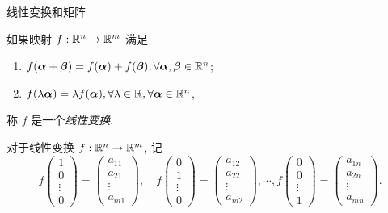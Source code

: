 \begin{frame}{线性变换和矩阵}
	\onslide<+->
	\begin{definition}
		如果映射 $f:{\mathbb{R}}^n\to{\mathbb{R}}^m$ 满足
		\begin{enumerate}
			\item $f({\boldsymbol{\alpha}}+{\boldsymbol{\beta}})=f({\boldsymbol{\alpha}})+f({\boldsymbol{\beta}}),\forall {\boldsymbol{\alpha}},{\boldsymbol{\beta}}\in {\mathbb{R}}^n$;
			\item $f(\lambda {\boldsymbol{\alpha}})=\lambda f({\boldsymbol{\alpha}}),\forall \lambda\in{\mathbb{R}},\forall{\boldsymbol{\alpha}}\in {\mathbb{R}}^n$,
		\end{enumerate}
		称 $f$ 是一个\emph{线性变换}.
	\end{definition}
	\onslide<+->
	对于线性变换 $f:{\mathbb{R}}^n\to{\mathbb{R}}^m$, 记
	\[f\begin{pmatrix}
		1\\0\\\vdots\\0
	\end{pmatrix}=\begin{pmatrix}
		a_{11}\\a_{21}\\\vdots\\a_{m1}
	\end{pmatrix},\quad
	f\begin{pmatrix}
		0\\1\\\vdots\\0
	\end{pmatrix}=\begin{pmatrix}
		a_{12}\\a_{22}\\\vdots\\a_{m2}
	\end{pmatrix},\cdots,
	f\begin{pmatrix}
		0\\0\\\vdots\\1
	\end{pmatrix}=\begin{pmatrix}
		a_{1n}\\a_{2n}\\\vdots\\a_{mn}
	\end{pmatrix}.\]
\end{frame}


